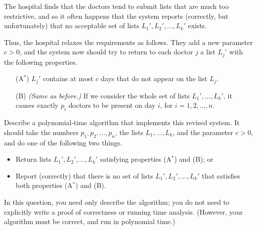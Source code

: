 \documentclass[12pt]{article}
\begin{document}
\begin{enumerate}
The hospital finds that the doctors tend to submit lists
that are much too restrictive, and so it often happens
that the system reports (correctly, but unfortunately)
that no acceptable set of lists $L_1', L_2', \ldots, L_k'$ exists.

Thus, the hospital relaxes the requirements as follows.
They add a new parameter $c > 0$, and
the system now should try to return to each doctor $j$ a
list $L_j'$ with the following properties.
\begin{itemize}
\item[(A$^*$)] $L_j'$ contains at most $c$ days that
do not appear on the list $L_j$.
\item[(B)] {\em (Same as before.)}
If we consider the whole set of lists $L_1', \ldots, L_k'$,
it causes exactly $p_i$ doctors to be present on day $i$,
for $i = 1, 2, \ldots, n$.
\end{itemize}

Describe a polynomial-time algorithm that implements
this revised system.
It should take the
numbers $p_1, p_2, \ldots, p_n$,
the lists $L_1, \ldots, L_k$,
and the parameter $c > 0$,
and do one of the following two things.
\begin{itemize}
\item Return lists $L_1', L_2', \ldots, L_k'$
satisfying properties (A$^*$) and (B); or
\item Report (correctly) that there is no
set of lists $L_1', L_2', \ldots, L_k'$
that satisfies both properties (A$^*$) and (B).
\end{itemize}

In this question, you need only describe the algorithm;
you do not need to explicitly write a proof of correctness
or running time analysis.
(However, your algorithm must be correct, and run in polynomial time.)

\end{enumerate}
\end{document}
